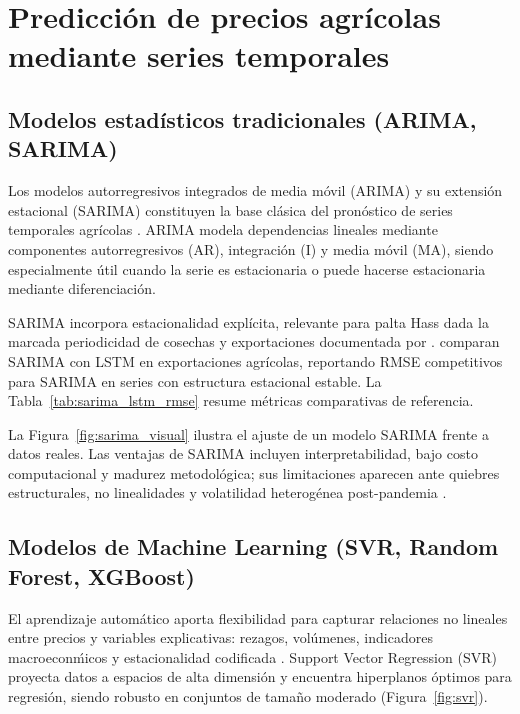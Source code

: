 \section{Predicci\'on de precios agr\'icolas mediante series temporales}

\subsection{Modelos estad\'isticos tradicionales (ARIMA, SARIMA)}

Los modelos autorregresivos integrados de media m\'ovil (ARIMA) y su extensi\'on estacional (SARIMA) constituyen la base cl\'asica del pron\'ostico de series temporales agr\'icolas \citep{Xia2024, Kurnadipare2025}. ARIMA modela dependencias lineales mediante componentes autorregresivos (AR), integraci\'on (I) y media m\'ovil (MA), siendo especialmente \'util cuando la serie es estacionaria o puede hacerse estacionaria mediante diferenciaci\'on.

SARIMA incorpora estacionalidad expl\'icita, relevante para palta Hass dada la marcada periodicidad de cosechas y exportaciones documentada por \citet{SierraSelva2020}. \citet{Kurnadipare2025} comparan SARIMA con LSTM en exportaciones agr\'icolas, reportando RMSE competitivos para SARIMA en series con estructura estacional estable. La Tabla~\ref{tab:sarima_lstm_rmse} resume m\'etricas comparativas de referencia.



La Figura~\ref{fig:sarima_visual} ilustra el ajuste de un modelo SARIMA frente a datos reales. Las ventajas de SARIMA incluyen interpretabilidad, bajo costo computacional y madurez metodol\'ogica; sus limitaciones aparecen ante quiebres estructurales, no linealidades y volatilidad heterog\'enea post-pandemia \citep{Velasquez2025}.


\subsection{Modelos de Machine Learning (SVR, Random Forest, XGBoost)}

El aprendizaje autom\'atico aporta flexibilidad para capturar relaciones no lineales entre precios y variables explicativas: rezagos, vol\'umenes, indicadores macroecon\'micos y estacionalidad codificada \citep{Paul2022, Theofilou2025}. Support Vector Regression (SVR) proyecta datos a espacios de alta dimensi\'on y encuentra hiperplanos \'optimos para regresi\'on, siendo robusto en conjuntos de tama\~no moderado (Figura~\ref{fig:svr}).

